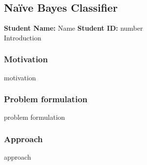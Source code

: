 \subsection{Naïve Bayes Classifier}
\textbf{Student Name: }Name \textbf{Student ID:} number\\
Introduction
\subsubsection*{Motivation}
motivation
\subsubsection*{Problem formulation}
problem formulation
\subsubsection*{Approach}
approach
